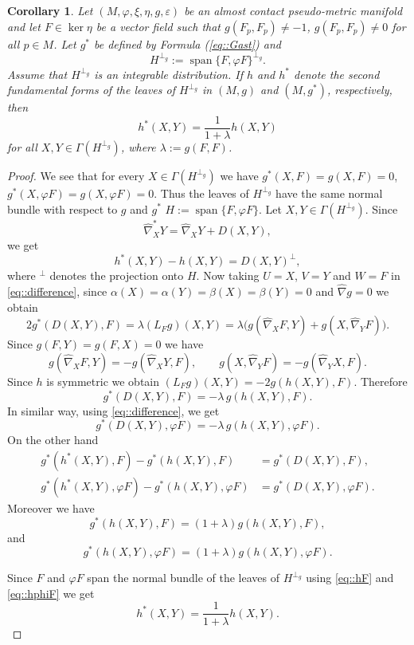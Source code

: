 \documentclass[12pt,a4paper,final]{amsart}
\numberwithin{equation}{section}
\newtheorem{wn}[tw]{Corollary}
\theoremstyle{df}
\newcommand{\Span}{\operatorname{span}}
\newcommand{\eps}{\varepsilon}
\begin{document}
\begin{wn}\label{wn::secondfund}
Let $(M,\varphi,\xi,\eta,g,\eps)$ be an almost contact pseudo-metric manifold
and let $F\in\ker\eta$ be a vector field such that $g(F_p,F_p)\neq -1$, $g(F_p,F_p)\neq 0$ for all $p\in M$. Let
$
g^\ast$ be defined by Formula (\ref{eq::Gast})
and
$$
H^{\perp_g}:=\Span\{F,\varphi F\}^{\perp_g}.
$$
Assume that $H^{\perp_g}$ is an integrable distribution. If $h$ and $h^\ast$
denote the second fundamental forms of the leaves of $H^{\perp_g}$ in
$(M,g)$ and $(M,g^\ast)$, respectively, then
$$
h^\ast(X,Y)=\frac{1}{1+\lambda}h(X,Y)
$$
for all $X,Y\in\Gamma(H^{\perp_g})$, where $\lambda:=g(F,F)$.
\end{wn}
\begin{proof}
We see that for every $X\in\Gamma(H^{\perp_g})$ we have $g^\ast(X,F)=g(X,F)=0$, $g^\ast(X,\varphi F)=g(X,\varphi F)=0$.
Thus the leaves of $H^{\perp_g}$ have the same normal bundle with respect to $g$ and $g^\ast$ $H:=\Span\{F,\varphi F\}$.
Let $X,Y\in\Gamma(H^{\perp_g})$. Since
$$
\widehat{\nabla}^\ast_XY=\widehat{\nabla}_XY+D(X,Y),
$$
we get
$$
h^\ast(X,Y)-h(X,Y)=D(X,Y)^\perp,
$$
where ${}^\perp$ denotes the projection onto $H$.
Now taking $U=X$, $V=Y$ and $W=F$ in \eqref{eq::difference}, since $\alpha(X)=\alpha(Y)=\beta(X)=\beta(Y)=0$ and $\widehat{\nabla}g=0$ we obtain
$$
2g^\ast(D(X,Y),F)=\lambda(L_Fg)(X,Y)=\lambda \bigl(g(\widehat{\nabla}_XF,Y)+g(X,\widehat{\nabla}_YF)\bigr).
$$
Since $g(F,Y)=g(F,X)=0$ we have
$$
g(\widehat{\nabla}_XF,Y)=-g(\widehat{\nabla}_XY,F),
\qquad
g(X,\widehat{\nabla}_YF)=-g(\widehat{\nabla}_YX,F).
$$
Since $h$ is symmetric we obtain $(L_Fg)(X,Y)=-2g(h(X,Y),F)$.
Therefore
\begin{equation}\label{eq::hF}
g^\ast(D(X,Y),F)=-\lambda\,g(h(X,Y),F).
\end{equation}
In similar way, using \eqref{eq::difference}, we get
\begin{equation}\label{eq::hphiF}
g^\ast(D(X,Y),\varphi F)=-\lambda\,g(h(X,Y),\varphi F).
\end{equation}
On the other hand
\begin{align*}
g^\ast(h^\ast(X,Y),F)-g^\ast(h(X,Y),F)
&=g^\ast(D(X,Y),F),\\
g^\ast(h^\ast(X,Y),\varphi F)-g^\ast(h(X,Y),\varphi F)
&=g^\ast(D(X,Y),\varphi F).
\end{align*}
Moreover we have
$$
g^\ast(h(X,Y),F)=(1+\lambda)g(h(X,Y),F),
$$
and
$$
g^\ast(h(X,Y),\varphi F)=(1+\lambda)g(h(X,Y),\varphi F).
$$

Since $F$ and $\varphi F$ span the normal bundle of the leaves of
$H^{\perp_g}$ using  \eqref{eq::hF} and \eqref{eq::hphiF} we get
$$
h^\ast(X,Y)=\frac{1}{1+\lambda}h(X,Y).
$$
\end{proof}
\end{document}

